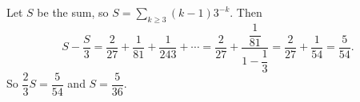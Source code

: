 Let $S$ be the sum, so $S=\displaystyle\sum_{k\ge3}(k-1)3^{-k}$. Then
\[S-\dfrac S3=\dfrac{2}{27}+\dfrac{1}{81}+\dfrac{1}{243}+\cdots=\dfrac2{27}+\dfrac{\dfrac1{81}}{1-\dfrac13}=\dfrac2{27}+\dfrac1{54}=\dfrac5{54}.\]
So $\dfrac23S=\dfrac5{54}$ and $S=\boxed{\dfrac5{36}}$.
